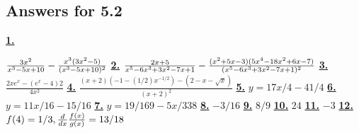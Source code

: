 \subsection *{Answers for 5.2}
\hypertarget {a:5.2.1}{\hyperlink {e:5.2.1}{\bfseries 1.}} \mdseries ${3x^2\over x^3-5x+10}-{x^3(3x^2-5)\over (x^3-5x+10)^2}$\qquad 
\hypertarget {a:5.2.2}{\hyperlink {e:5.2.2}{\bfseries 2.}} \mdseries ${2x+5\over x^5-6x^3+3x^2-7x+1}- {(x^2+5x-3)(5x^4-18x^2+6x-7)\over (x^5-6x^3+3x^2-7x+1)^2}$\qquad 
\hypertarget {a:5.2.3}{\hyperlink {e:5.2.3}{\bfseries 3.}} \mdseries $\frac {2xe^x-(e^x-4)2}{4x^2}$\qquad 
\hypertarget {a:5.2.4}{\hyperlink {e:5.2.4}{\bfseries 4.}} \mdseries $\frac {(x+2)(-1-(1/2)x^{-1/2}) - (2-x-\sqrt {x})}{(x+2)^2}$\qquad 
\hypertarget {a:5.2.5}{\hyperlink {e:5.2.5}{\bfseries 5.}} \mdseries $y=17x/4-41/4$\qquad 
\hypertarget {a:5.2.6}{\hyperlink {e:5.2.6}{\bfseries 6.}} \mdseries $y=11x/16-15/16$\qquad 
\hypertarget {a:5.2.7}{\hyperlink {e:5.2.7}{\bfseries 7.}} \mdseries $y=19/169-5x/338$\qquad 
\hypertarget {a:5.2.8}{\hyperlink {e:5.2.8}{\bfseries 8.}} \mdseries $-3/16$\qquad 
\hypertarget {a:5.2.9}{\hyperlink {e:5.2.9}{\bfseries 9.}} \mdseries $8/9$\qquad 
\hypertarget {a:5.2.10}{\hyperlink {e:5.2.10}{\bfseries 10.}} \mdseries $24$\qquad 
\hypertarget {a:5.2.11}{\hyperlink {e:5.2.11}{\bfseries 11.}} \mdseries $-3$\qquad 
\hypertarget {a:5.2.12}{\hyperlink {e:5.2.12}{\bfseries 12.}} \mdseries $f(4) = 1/3, \frac{d}{dx} \frac {f(x)}{g(x)} = 13/18$\qquad 
